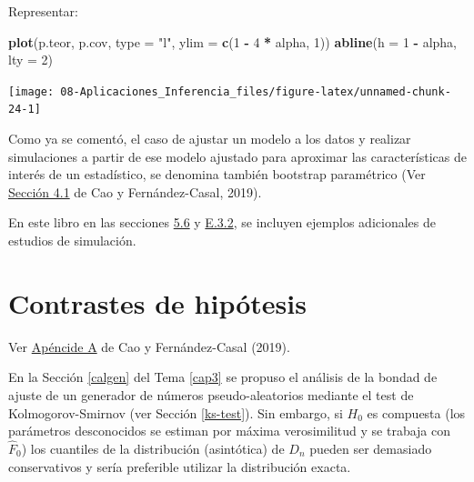 \documentclass[
]{book}
\newenvironment{Shaded}{\begin{snugshade}}{\end{snugshade}}
\newcommand{\DataTypeTok}[1]{\textcolor[rgb]{0.13,0.29,0.53}{#1}}
\newcommand{\DecValTok}[1]{\textcolor[rgb]{0.00,0.00,0.81}{#1}}
\newcommand{\KeywordTok}[1]{\textcolor[rgb]{0.13,0.29,0.53}{\textbf{#1}}}
\newcommand{\NormalTok}[1]{#1}
\newcommand{\OperatorTok}[1]{\textcolor[rgb]{0.81,0.36,0.00}{\textbf{#1}}}
\newcommand{\StringTok}[1]{\textcolor[rgb]{0.31,0.60,0.02}{#1}}
\theoremstyle{break}
\theoremstyle{definition}
\theoremstyle{definition}
\theoremstyle{definition}
\theoremstyle{remark}
\let\BeginKnitrBlock\begin \let\EndKnitrBlock\end
\begin{document}
\begin{enumerate}
  Representar:

\begin{Shaded}
\begin{Highlighting}[]
\KeywordTok{plot}\NormalTok{(p.teor, p.cov, }\DataTypeTok{type =} \StringTok{"l"}\NormalTok{, }\DataTypeTok{ylim =} \KeywordTok{c}\NormalTok{(}\DecValTok{1} \OperatorTok{-}\StringTok{ }\DecValTok{4} \OperatorTok{*}\StringTok{ }\NormalTok{alpha, }\DecValTok{1}\NormalTok{))}
\KeywordTok{abline}\NormalTok{(}\DataTypeTok{h =} \DecValTok{1} \OperatorTok{-}\StringTok{ }\NormalTok{alpha, }\DataTypeTok{lty =} \DecValTok{2}\NormalTok{) }
\end{Highlighting}
\end{Shaded}

  \begin{center}\texttt{[image: 08-Aplicaciones\_Inferencia\_files/figure-latex/unnamed-chunk-24-1]} \end{center}
\end{enumerate}

Como ya se comentó, el caso de ajustar un modelo a los datos y realizar simulaciones a partir de ese modelo ajustado para aproximar las características de interés de un estadístico, se denomina también bootstrap paramétrico (Ver \href{https://rubenfcasal.github.io/book_remuestreo/cap4-boot-par.html}{Sección 4.1} de Cao y Fernández-Casal, 2019).

En este libro en las secciones \href{https://rubenfcasal.github.io/book_remuestreo/cap5-ejem.html}{5.6} y \href{https://rubenfcasal.github.io/book_remuestreo/ejemplos-1.html\#estudio-de-simulaci\%C3\%B3n}{E.3.2}, se incluyen ejemplos adicionales de estudios de simulación.

\hypertarget{contrastes}{%
\section{Contrastes de hipótesis}\label{contrastes}}

Ver \href{https://rubenfcasal.github.io/book_remuestreo/practica2.html}{Apéncide A} de Cao y Fernández-Casal (2019).

\BeginKnitrBlock{exercise}[Test de Kolmogorov-Smirnov]
\protect\hypertarget{exr:ks-test-sim}{}{\label{exr:ks-test-sim} {} }
\EndKnitrBlock{exercise}

En la Sección \ref{calgen} del Tema \ref{cap3} se propuso el análisis de la bondad de ajuste de un generador de números pseudo-aleatorios mediante el test de Kolmogorov-Smirnov (ver Sección \ref{ks-test}).
Sin embargo, si \(H_{0}\) es compuesta (los parámetros desconocidos se estiman por máxima verosimilitud y se trabaja con \(\hat{F}_{0}\)) los cuantiles de la distribución (asintótica) de \(D_{n}\) pueden ser demasiado conservativos y sería preferible utilizar la distribución exacta.
\end{document}
